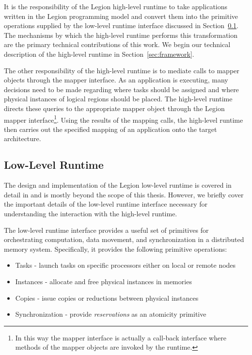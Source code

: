 It is the responsibility of the Legion high-level 
runtime to take applications written in the Legion 
programming model and convert them into the primitive
operations supplied by the low-level runtime interface
discussed in Section~\ref{subsec:lowlevel}. The 
mechanisms by which the high-level runtime performs this
transformation are the primary technical contributions
of this work. We begin our technical description of the
high-level runtime in Section~\ref{sec:framework}.

The other responsibility of the high-level runtime is
to mediate calls to mapper objects through the mapper
interface. As an application is executing, many decisions
need to be made regarding where tasks should be assigned
and where physical instances of logical regions should be 
placed. The high-level runtime directs these queries to the 
appropriate mapper object through the Legion mapper
interface\footnote{In this way the mapper interface is actually 
a call-back interface where methods of the mapper objects 
are invoked by the runtime.}.  Using the results of the 
mapping calls, the high-level runtime then carries out 
the specified mapping of an application onto the 
target architecture.

\subsection{Low-Level Runtime}
\label{subsec:lowlevel}
The design and implementation of the Legion low-level
runtime is covered in detail in \cite{Realm14} and is
mostly beyond the scope of this thesis.  However, we
briefly cover the important details of the low-level
runtime interface necessary for understanding the
interaction with the high-level runtime. 

The low-level runtime interface provides a useful set
of primitives for orchestrating computation, data
movement, and synchronization in a distributed memory
system. Specifically, it provides the following 
primitive operations:

\begin{itemize}
\item Tasks - launch tasks on specific processors either
              on local or remote nodes
\item Instances - allocate and free physical instances
                  in memories 
\item Copies - issue copies or reductions between physical instances
\item Synchronization - provide {\em reservations} as an 
                        atomicity primitive
\end{itemize}


